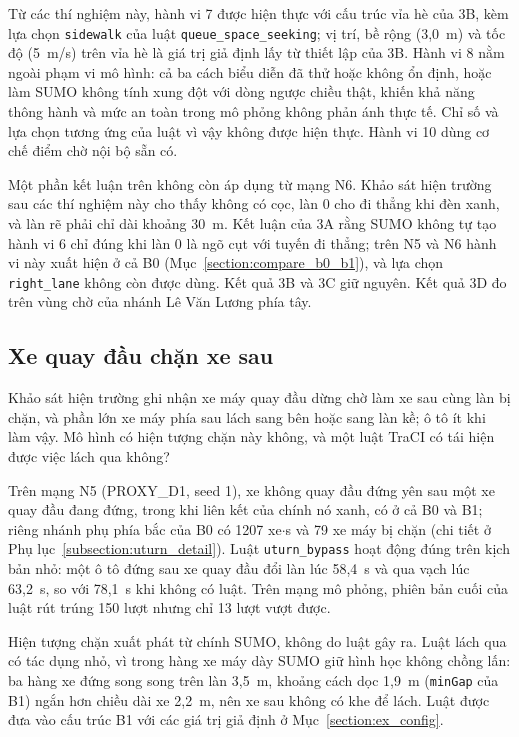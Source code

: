 \documentclass[../main.tex]{subfiles}
\begin{document}
Từ các thí nghiệm này, hành vi 7 được hiện thực với cấu trúc vỉa hè của 3B, kèm lựa chọn \texttt{sidewalk} của luật \texttt{queue\_space\_seeking}; vị trí, bề rộng (3,0~m) và tốc độ (5~m/s) trên vỉa hè là giá trị giả định lấy từ thiết lập của 3B. Hành vi 8 nằm ngoài phạm vi mô hình: cả ba cách biểu diễn đã thử hoặc không ổn định, hoặc làm SUMO không tính xung đột với dòng ngược chiều thật, khiến khả năng thông hành và mức an toàn trong mô phỏng không phản ánh thực tế. Chỉ số và lựa chọn tương ứng của luật vì vậy không được hiện thực. Hành vi 10 dùng cơ chế điểm chờ nội bộ sẵn có.

Một phần kết luận trên không còn áp dụng từ mạng N6. Khảo sát hiện trường sau các thí nghiệm này cho thấy không có cọc, làn 0 cho đi thẳng khi đèn xanh, và làn rẽ phải chỉ dài khoảng 30~m. Kết luận của 3A rằng SUMO không tự tạo hành vi 6 chỉ đúng khi làn 0 là ngõ cụt với tuyến đi thẳng; trên N5 và N6 hành vi này xuất hiện ở cả B0 (Mục~\ref{section:compare_b0_b1}), và lựa chọn \texttt{right\_lane} không còn được dùng. Kết quả 3B và 3C giữ nguyên. Kết quả 3D đo trên vùng chờ của nhánh Lê Văn Lương phía tây.

\subsection{Xe quay đầu chặn xe sau}
\label{subsection:uturn}

Khảo sát hiện trường ghi nhận xe máy quay đầu dừng chờ làm xe sau cùng làn bị chặn, và phần lớn xe máy phía sau lách sang bên hoặc sang làn kề; ô tô ít khi làm vậy. Mô hình có hiện tượng chặn này không, và một luật TraCI có tái hiện được việc lách qua không?

Trên mạng N5 (PROXY\_D1, seed 1), xe không quay đầu đứng yên sau một xe quay đầu đang đứng, trong khi liên kết của chính nó xanh, có ở cả B0 và B1; riêng nhánh phụ phía bắc của B0 có 1207 xe$\cdot$s và 79 xe máy bị chặn (chi tiết ở Phụ lục~\ref{subsection:uturn_detail}). Luật \texttt{uturn\_bypass} hoạt động đúng trên kịch bản nhỏ: một ô tô đứng sau xe quay đầu đổi làn lúc 58,4~s và qua vạch lúc 63,2~s, so với 78,1~s khi không có luật. Trên mạng mô phỏng, phiên bản cuối của luật rút trúng 150 lượt nhưng chỉ 13 lượt vượt được.

Hiện tượng chặn xuất phát từ chính SUMO, không do luật gây ra. Luật lách qua có tác dụng nhỏ, vì trong hàng xe máy dày SUMO giữ hình học không chồng lấn: ba hàng xe đứng song song trên làn 3,5~m, khoảng cách dọc 1,9~m (\texttt{minGap} của B1) ngắn hơn chiều dài xe 2,2~m, nên xe sau không có khe để lách. Luật được đưa vào cấu trúc B1 với các giá trị giả định ở Mục~\ref{section:ex_config}.
\end{document}
